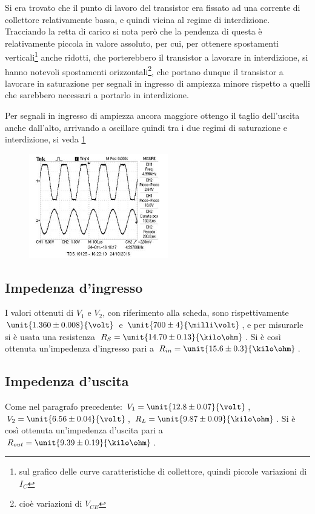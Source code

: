 \documentclass[10pt,a4paper]{article}
\begin{document}
Si era trovato che il punto di lavoro del transistor era fissato ad una corrente di collettore relativamente bassa, e quindi vicina al regime di interdizione. Tracciando la retta di carico si nota però che la pendenza di questa è relativamente piccola in valore assoluto, per cui, per ottenere spostamenti verticali\footnote{sul grafico delle curve caratteristiche di collettore, quindi piccole variazioni di $I_C$} anche ridotti, che porterebbero il transistor a lavorare in interdizione, si hanno notevoli spostamenti orizzontali\footnote{cioè variazioni di $V_{CE}$}, che portano dunque il transistor a lavorare in saturazione per segnali in ingresso di ampiezza minore rispetto a quelli che sarebbero necessari a portarlo in interdizione.

Per segnali in ingresso di ampiezza ancora maggiore ottengo il taglio dell'uscita anche dall'alto, arrivando a oscillare quindi tra i due regimi di saturazione e interdizione, si veda \figurename{\ref{fig:clippingdoppio}}

\begin{figure}[h!]
	\centering
	\includegraphics[width=0.54\textwidth]{../oscilloscopio/clipall.jpg}
	\caption{}
	\label{fig:clippingdoppio}
\end{figure}

\subsection{Impedenza d'ingresso}
I valori ottenuti di $V_1$ e $V_2$, con riferimento alla scheda, sono rispettivamente $\unit{1.360 \pm 0.008}{\volt}$ e $\unit{700 \pm 4}{\milli\volt}$, e per misurarle si è usata una resistenza $R_S = \unit{14.70 \pm 0.13}{\kilo\ohm}$.
Si è così ottenuta un'impedenza d'ingresso pari a $R_{in} = \unit{15.6 \pm 0.3}{\kilo\ohm}$.

\subsection{Impedenza d'uscita}
Come nel paragrafo precedente: $V_1 = \unit{12.8 \pm 0.07}{\volt}$, $V_2 = \unit{6.56 \pm 0.04}{\volt}$, $R_L = \unit{9.87 \pm 0.09}{\kilo\ohm}$.
Si è così ottenuta un'impedenza d'uscita pari a $R_{out} = \unit{9.39 \pm 0.19}{\kilo\ohm}$.
\end{document}
